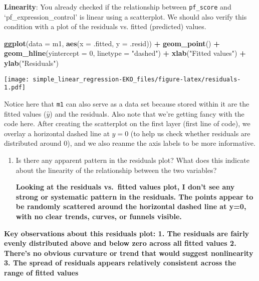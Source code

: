\documentclass[
]{article}
\newenvironment{Shaded}{\begin{snugshade}}{\end{snugshade}}
\newcommand{\AttributeTok}[1]{\textcolor[rgb]{0.13,0.29,0.53}{#1}}
\newcommand{\DecValTok}[1]{\textcolor[rgb]{0.00,0.00,0.81}{#1}}
\newcommand{\FunctionTok}[1]{\textcolor[rgb]{0.13,0.29,0.53}{\textbf{#1}}}
\newcommand{\NormalTok}[1]{#1}
\newcommand{\SpecialCharTok}[1]{\textcolor[rgb]{0.81,0.36,0.00}{\textbf{#1}}}
\newcommand{\StringTok}[1]{\textcolor[rgb]{0.31,0.60,0.02}{#1}}
\begin{document}
\textbf{Linearity}: You already checked if the relationship between
\texttt{pf\_score} and `pf\_expression\_control' is linear using a
scatterplot. We should also verify this condition with a plot of the
residuals vs. fitted (predicted) values.

\begin{Shaded}
\begin{Highlighting}[]
\FunctionTok{ggplot}\NormalTok{(}\AttributeTok{data =}\NormalTok{ m1, }\FunctionTok{aes}\NormalTok{(}\AttributeTok{x =}\NormalTok{ .fitted, }\AttributeTok{y =}\NormalTok{ .resid)) }\SpecialCharTok{+}
  \FunctionTok{geom\_point}\NormalTok{() }\SpecialCharTok{+}
  \FunctionTok{geom\_hline}\NormalTok{(}\AttributeTok{yintercept =} \DecValTok{0}\NormalTok{, }\AttributeTok{linetype =} \StringTok{"dashed"}\NormalTok{) }\SpecialCharTok{+}
  \FunctionTok{xlab}\NormalTok{(}\StringTok{"Fitted values"}\NormalTok{) }\SpecialCharTok{+}
  \FunctionTok{ylab}\NormalTok{(}\StringTok{"Residuals"}\NormalTok{)}
\end{Highlighting}
\end{Shaded}

\texttt{[image: simple\_linear\_regression-EKO\_files/figure-latex/residuals-1.pdf]}

Notice here that \texttt{m1} can also serve as a data set because stored
within it are the fitted values (\(\hat{y}\)) and the residuals. Also
note that we're getting fancy with the code here. After creating the
scatterplot on the first layer (first line of code), we overlay a
horizontal dashed line at \(y = 0\) (to help us check whether residuals
are distributed around 0), and we also reanme the axis labels to be more
informative.

\begin{enumerate}
\def\labelenumi{\arabic{enumi}.}
\setcounter{enumi}{6}
\item
  Is there any apparent pattern in the residuals plot? What does this
  indicate about the linearity of the relationship between the two
  variables?

  \textbf{Looking at the residuals vs.~fitted values plot, I don't see
  any strong or systematic pattern in the residuals. The points appear
  to be randomly scattered around the horizontal dashed line at y=0,
  with no clear trends, curves, or funnels visible.}
\end{enumerate}

\textbf{Key observations about this residuals plot: 1. The residuals are
fairly evenly distributed above and below zero across all fitted values
2. There's no obvious curvature or trend that would suggest nonlinearity
3. The spread of residuals appears relatively consistent across the
range of fitted values}
\end{document}
